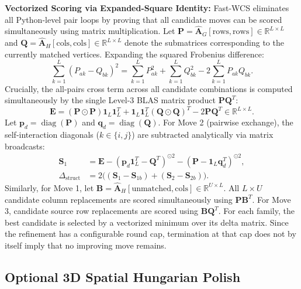 \documentclass[conference]{IEEEtran}
\begin{document}
\noindent\textbf{Vectorized Scoring via Expanded-Square Identity:} Fast-WCS eliminates all Python-level pair loops by proving that all candidate moves can be scored simultaneously using matrix multiplication. Let $\mathbf{P} = \hat{\mathbf{A}}_G[\text{rows}, \text{rows}] \in \mathbb{R}^{L \times L}$ and $\mathbf{Q} = \hat{\mathbf{A}}_H[\text{cols}, \text{cols}] \in \mathbb{R}^{L \times L}$ denote the submatrices corresponding to the currently matched vertices. Expanding the squared Frobenius difference:
\begin{equation}
\sum_{k=1}^L (P_{ak} - Q_{bk})^2 = \sum_{k=1}^L P_{ak}^2 + \sum_{k=1}^L Q_{bk}^2 - 2 \sum_{k=1}^L P_{ak} Q_{bk}.
\end{equation}
Crucially, the all-pairs cross term across all candidate combinations is computed simultaneously by the single Level-3 BLAS matrix product $\mathbf{P}\mathbf{Q}^T$:
\begin{equation}
\mathbf{E} = (\mathbf{P} \odot \mathbf{P})\mathbf{1}_L \mathbf{1}_L^T + \mathbf{1}_L \mathbf{1}_L^T (\mathbf{Q} \odot \mathbf{Q})^T - 2 \mathbf{P}\mathbf{Q}^T \in \mathbb{R}^{L \times L}.
\end{equation}
Let $\mathbf{p}_d = \operatorname{diag}(\mathbf{P})$ and $\mathbf{q}_d = \operatorname{diag}(\mathbf{Q})$. For Move 2 (pairwise exchange), the self-interaction diagonals ($k \in \{i, j\}$) are subtracted analytically via matrix broadcasts:
\begin{align}
\mathbf{S}_1 &= \mathbf{E} - (\mathbf{p}_d\mathbf{1}_L^T - \mathbf{Q}^T)^{\odot 2} - (\mathbf{P} - \mathbf{1}_L\mathbf{q}_d^T)^{\odot 2}, \\
\Delta_{\text{struct}} &= 2\big( (\mathbf{S}_1 - \mathbf{S}_{1b}) + (\mathbf{S}_2 - \mathbf{S}_{2b}) \big).
\end{align}
Similarly, for Move 1, let $\mathbf{B} = \hat{\mathbf{A}}_H[\text{unmatched}, \text{cols}] \in \mathbb{R}^{U \times L}$. All $L \times U$ candidate column replacements are scored simultaneously using $\mathbf{P}\mathbf{B}^T$. For Move 3, candidate source row replacements are scored using $\mathbf{B}\mathbf{Q}^T$.
For each family, the best candidate is selected by a vectorized minimum over its delta matrix. Since the refinement has a configurable round cap, termination at that cap does not by itself imply that no improving move remains.

\subsection{Optional 3D Spatial Hungarian Polish}
\label{subsec:dgm}
\end{document}
